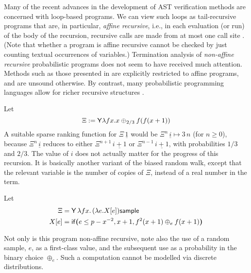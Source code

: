 Many of the recent advances in the development of AST verification methods \cite{DBLP:conf/pldi/ChenH20,DBLP:conf/cav/ChakarovS13,DBLP:conf/popl/FioritiH15,DBLP:journals/pacmpl/McIverMKK18,DBLP:conf/aplas/HuangFC18,DBLP:conf/popl/ChatterjeeNZ17,DBLP:journals/pacmpl/AgrawalC018,DBLP:conf/cav/ChatterjeeFG16,DBLP:conf/lics/OlmedoKKM16,DBLP:journals/pacmpl/Huang0CG19} are concerned with loop-based programs.
We can view such loops as tail-recursive programs that are, in particular, \emph{affine recursive}, i.e., 
in each evaluation (or run) of the body of the recursion, recursive calls are made from at most one call site \cite[\S 4.1]{DBLP:journals/toplas/LagoG19}.
(Note that whether a program is affine recursive cannot be checked by just counting textual occurrences of variables.)
Termination analysis of \emph{non-affine recursive} probabilistic programs does not seem to have received much attention.
Methods such as those presented in \cite{DBLP:journals/toplas/LagoG19} are explicitly restricted to affine programs, and are unsound otherwise.
By contrast, many probabilistic programming languages allow for richer recursive structures \cite{DBLP:conf/pkdd/TolpinMW15,DBLP:conf/uai/GoodmanMRBT08,DBLP:journals/corr/MansinghkaSP14}.

\medskip


Let 
\[
\Xi := \mathsf{Y} \lambda f x. x \oplus_{2/3} f (f (x + 1))
\] 
A suitable sparse ranking function for $\Xi \, \underline 1$ would be $\Xi^n \, \underline i \mapsto 3 \, n$ (for $n \geq 0$), because $\Xi^n \, \underline i$ reduces to either $\Xi^{n+1} \, \underline{i+1}$ or $\Xi^{n-1} \, \underline{i+1}$, with probabilities $1/3$ and $2/3$. The value of $i$ does not actually matter for the progress of this recursion. It is basically another variant of the biased random walk, except that the relevant variable is the number of copies of $\Xi$, instead of a real number in the term.


Let
\begin{align*}
\Xi & = \mathsf{Y}\, \lambda f x.\, (\lambda e. X[e]) \mathsf{sample} \\
X[e] & = \mathsf{if}\boldsymbol{(}e \leq p - x^{-2}, x+1, f^2(x+1) \oplus_e f(x+1)\boldsymbol{)}
\end{align*}

Not only is this program non-affine recursive,
note also the use of a random sample, $e$, as a first-class value, and the subsequent use as a probability in the binary choice $\oplus_e$.
Such a computation cannot be modelled via discrete distributions. 

